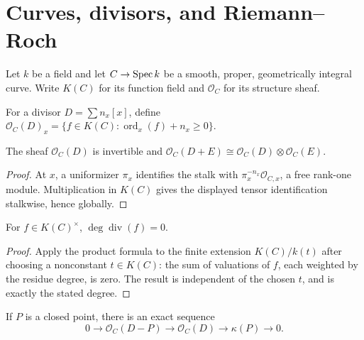 \chapter{Curves, divisors, and Riemann--Roch}
\label{mk-ch-curves}

Let \(k\) be a field and let \(C\to\operatorname{Spec} k\) be a smooth, proper,
geometrically integral curve.  Write \(K(C)\) for its function field and
\(\mathcal O_C\) for its structure sheaf.

\begin{definition}
  \label{mk-def-divisor-line-bundle}
  \cite{hartshorne-ag}
  For a divisor \(D=\sum n_x[x]\), define
  \(\mathcal O_C(D)_x=\{f\in K(C):\operatorname{ord}_x(f)+n_x\ge0\}\).
\end{definition}

\begin{lemma}
  \label{mk-lem-divisor-invertible}
  \cite{hartshorne-ag}
  The sheaf \(\mathcal O_C(D)\) is invertible and
  \(\mathcal O_C(D+E)\cong\mathcal O_C(D)\otimes\mathcal O_C(E)\).
\end{lemma}

\begin{proof}
  At \(x\), a uniformizer \(\pi_x\) identifies the stalk with
  \(\pi_x^{-n_x}\mathcal O_{C,x}\), a free rank-one module.  Multiplication in
  \(K(C)\) gives the displayed tensor identification stalkwise, hence globally.
\end{proof}

\begin{lemma}
  \label{mk-lem-principal-degree-zero}
  \cite{hartshorne-ag,papaioannou-rr}
  For \(f\in K(C)^\times\), \(\deg\operatorname{div}(f)=0\).
\end{lemma}

\begin{proof}
  Apply the product formula to the finite extension \(K(C)/k(t)\) after
  choosing a nonconstant \(t\in K(C)\): the sum of valuations of \(f\), each
  weighted by the residue degree, is zero.  The result is independent of the
  chosen \(t\), and is exactly the stated degree.
\end{proof}

\begin{lemma}
  \label{mk-lem-divisor-exact-sequence}
  \cite{hartshorne-ag}
  If \(P\) is a closed point, there is an exact sequence
  \[
    0\longrightarrow\mathcal O_C(D-P)\longrightarrow\mathcal O_C(D)
    \longrightarrow\kappa(P)\longrightarrow0.
  \]
\end{lemma}

